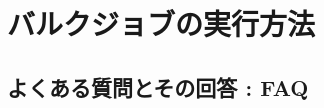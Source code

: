 \documentclass[a4paper]{jreport}
\begin{document}
 \chapter{バルクジョブの実行方法}
 




\begin{appendix}
%
%
\chapter{よくある質問とその回答 : FAQ} \label{achap:practice}


\end{appendix}

\ClearWallPaper

\end{document}
